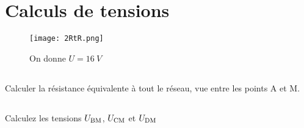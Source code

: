 \documentclass[10pt,a4paper]{article}
\begin{document}
\newpage

\section{Calculs de tensions}
\vspace*{-20pt}
\begin{figure}[htbp!]
    \centering
    \texttt{[image: 2RtR.png]}
    \captionsetup{justification=centering}
    \caption{On donne $U = \SI{16}{V}$}
    \label{fig:ex3}
\end{figure}

\subsection{}Calculer la résistance équivalente à tout le réseau, vue entre les
points A et M.
\vfill
\subsection{}Calculez les tensions $U_{\text{BM}}$, $U _{\text{CM}}$ et $U_{\text{DM}}$
\vfill
\end{document}
